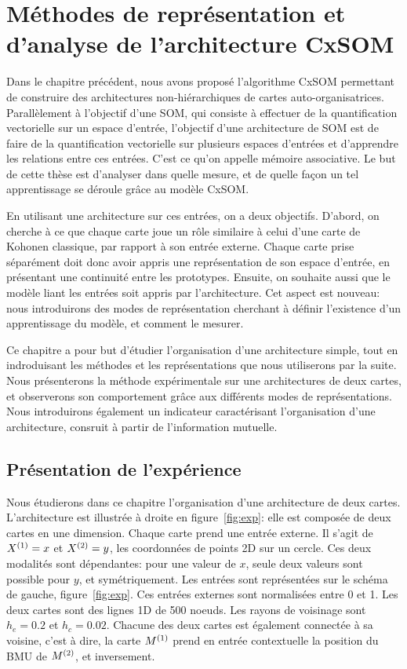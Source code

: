\chapter{Méthodes de représentation et d'analyse de l'architecture CxSOM}
\graphicspath{{03-Representation/}}
\minitoc

Dans le chapitre précédent, nous avons proposé l'algorithme CxSOM permettant de construire des architectures non-hiérarchiques de cartes auto-organisatrices.
Parallèlement à l'objectif d'une SOM, qui consiste à effectuer de la quantification vectorielle sur un espace d'entrée, l'objectif d'une architecture de SOM est de faire de la quantification vectorielle sur plusieurs espaces d'entrées et d'apprendre les relations entre ces entrées.
C'est ce qu'on appelle mémoire associative. Le but de cette thèse est d'analyser dans quelle mesure, et de quelle façon un tel apprentissage se déroule grâce au modèle CxSOM.

En utilisant une architecture sur ces entrées, on a deux objectifs. D'abord, on cherche à ce que chaque carte joue un rôle similaire à celui d'une carte de Kohonen classique, par rapport à son entrée externe.
Chaque carte prise séparément doit donc avoir appris une représentation de son espace d'entrée, en présentant une continuité entre les prototypes.
Ensuite, on souhaite aussi que le modèle liant les entrées soit appris par l'architecture. Cet aspect est nouveau:
nous introduirons des modes de représentation cherchant à définir l'existence d'un apprentissage du modèle, et comment le mesurer.

Ce chapitre a pour but d'étudier l'organisation d'une architecture simple, tout en indroduisant les méthodes et les représentations que nous utiliserons par la suite.
Nous présenterons la méthode expérimentale sur une architectures de deux cartes, et observerons son comportement grâce aux différents modes de représentations.
Nous introduirons également un indicateur caractérisant l'organisation d'une architecture, consruit à partir de l'information mutuelle.

\section{Présentation de l'expérience}

Nous étudierons dans ce chapitre l'organisation d'une architecture de deux cartes. L'architecture est illustrée à droite en figure~\ref{fig:exp}: elle est composée de deux cartes en une dimension. Chaque carte prend une entrée externe. Il s'agit de $X^{({1})}=x$ et $X^{({2})}=y$, les coordonnées de points 2D sur un cercle. Ces deux modalités sont dépendantes: pour une valeur de $x$, seule deux valeurs sont possible pour $y$, et symétriquement. Les entrées sont représentées sur le schéma de gauche, figure~\ref{fig:exp}.
Ces entrées externes sont normalisées entre 0 et 1. Les deux cartes sont des lignes 1D de 500 noeuds. Les rayons de voisinage sont $h_e = 0.2$ et $h_c = 0.02$.
Chacune des deux cartes est également connectée à sa voisine, c'est à dire, la carte $M^{({1})}$ prend en entrée contextuelle la position du BMU de $M^{({2})}$, et inversement.


